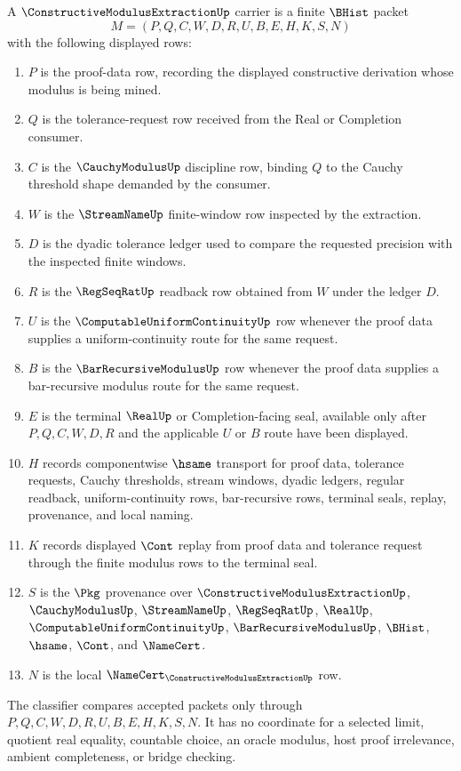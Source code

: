 \begin{definition}
\label{def:constructive-modulus-extraction-carrier}
A $\ConstructiveModulusExtractionUp$ carrier is a finite $\BHist$ packet
$$
M=(P,Q,C,W,D,R,U,B,E,H,K,S,N)
$$
with the following displayed rows:
\begin{enumerate}
\item $P$ is the proof-data row, recording the displayed constructive derivation whose modulus is being mined.
\item $Q$ is the tolerance-request row received from the Real or Completion consumer.
\item $C$ is the $\CauchyModulusUp$ discipline row, binding $Q$ to the Cauchy threshold shape demanded by the consumer.
\item $W$ is the $\StreamNameUp$ finite-window row inspected by the extraction.
\item $D$ is the dyadic tolerance ledger used to compare the requested precision with the inspected finite windows.
\item $R$ is the $\RegSeqRatUp$ readback row obtained from $W$ under the ledger $D$.
\item $U$ is the $\ComputableUniformContinuityUp$ row whenever the proof data supplies a uniform-continuity route for the same request.
\item $B$ is the $\BarRecursiveModulusUp$ row whenever the proof data supplies a bar-recursive modulus route for the same request.
\item $E$ is the terminal $\RealUp$ or Completion-facing seal, available only after $P,Q,C,W,D,R$ and the applicable $U$ or $B$ route have been displayed.
\item $H$ records componentwise $\hsame$ transport for proof data, tolerance requests, Cauchy thresholds, stream windows, dyadic ledgers, regular readback, uniform-continuity rows, bar-recursive rows, terminal seals, replay, provenance, and local naming.
\item $K$ records displayed $\Cont$ replay from proof data and tolerance request through the finite modulus rows to the terminal seal.
\item $S$ is the $\Pkg$ provenance over $\ConstructiveModulusExtractionUp$, $\CauchyModulusUp$, $\StreamNameUp$, $\RegSeqRatUp$, $\RealUp$, $\ComputableUniformContinuityUp$, $\BarRecursiveModulusUp$, $\BHist$, $\hsame$, $\Cont$, and $\NameCert$.
\item $N$ is the local $\NameCert_{\ConstructiveModulusExtractionUp}$ row.
\end{enumerate}
The classifier compares accepted packets only through $P,Q,C,W,D,R,U,B,E,H,K,S,N$. It has no coordinate for a selected limit, quotient real equality, countable choice, an oracle modulus, host proof irrelevance, ambient completeness, or bridge checking.
\end{definition}

